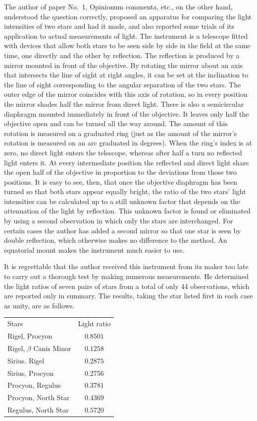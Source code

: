 The author of paper No.~1, Opinionum commenta, etc., on the other hand, understood the question correctly, proposed an apparatus for comparing the light intensities of two stars and had it made, and also reported some trials of its application to actual measurements of light. The instrument is a telescope fitted with devices that allow both stars to be seen side by side in the field at the same time, one directly and the other by reflection. The reflection is produced by a mirror mounted in front of the objective. By rotating the mirror about an axis that intersects the line of sight at right angles, it can be set at the inclination to the line of sight corresponding to the angular separation of the two stars. The outer edge of the mirror coincides with this axis of rotation, so in every position the mirror shades half the mirror from direct light. There is also a semicircular diaphragm mounted immediately in front of the objective. It leaves only half the objective open and can be turned all the way around. The amount of this rotation is measured on a graduated ring (just as the amount of the mirror's rotation is measured on an arc graduated in degrees). When the ring's index is at zero, no direct light enters the telescope, whereas after half a turn no reflected light enters it. At every intermediate position the reflected and direct light share the open half of the objective in proportion to the deviations from those two positions. It is easy to see, then, that once the objective diaphragm has been turned so that both stars appear equally bright, the ratio of the two stars' light intensities can be calculated up to a still unknown factor that depends on the attenuation of the light by reflection. This unknown factor is found or eliminated by using a second observation in which only the stars are interchanged. For certain cases the author has added a second mirror so that one star is seen by double reflection, which otherwise makes no difference to the method. An equatorial mount makes the instrument much easier to use.

It is regrettable that the author received this instrument from its maker too late to carry out a thorough test by making numerous measurements. He determined the light ratios of seven pairs of stars from a total of only 44 observations, which are reported only in summary. The results, taking the star listed first in each case as unity, are as follows.
\begin{center}
\begin{tabular}{lc}
Stars & Light ratio\\[3pt]
Rigel, Procyon & $0.8501$\\
Rigel, $\beta$ Canis Minor & $0.1258$\\
Sirius. Rigel & $0.2875$\\
Sirius, Procyon & $0.2756$\\
Procyon, Regulus & $0.3781$\\
Procyon, North Star & $0.4369$\\
Regulus, North Star & $0.5720$
\end{tabular}
\end{center}

